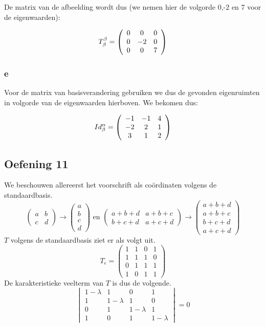 \documentclass[lineaire_algebra_oplossingen.tex]{subfiles}
\begin{document}
De matrix van de afbeelding wordt dus (we nemen hier de volgorde 0,-2 en 7 voor de eigenwaarden):

\[
T^\beta_\beta = \left(
\begin{array}{c c c}
0 & 0 & 0 \\
0 & -2 & 0 \\
0 & 0 & 7 \\
\end{array}
\right)
\]

\subsubsection*{e}

Voor de matrix van basisverandering gebruiken we dus de gevonden eigenruimten in volgorde van de eigenwaarden hierboven. We bekomen dus:

\[
Id^\alpha_\beta = \left(
\begin{array}{c c c}
-1 & -1 & 4 \\
-2 & 2 & 1 \\
3 & 1 & 2 \\
\end{array}
\right)
\]

\subsection{Oefening 11}
We beschouwen allereerst het voorschrift als co\"ordinaten volgens de standaardbasis.
\[
\begin{pmatrix}
a & b\\
c & d
\end{pmatrix}
\rightarrow
\begin{pmatrix}
a \\ b \\ c \\ d
\end{pmatrix}
\text{ en }
\begin{pmatrix}
a+b+d & a+b+c\\
b+c+d & a+c+d
\end{pmatrix}
\rightarrow
\begin{pmatrix}
a+b+d \\ a+b+c \\ b+c+d \\ a+c+d
\end{pmatrix}
\]
$T$ volgens de standaardbasis ziet er als volgt uit. 
\[
T_\epsilon =
\begin{pmatrix}
1 & 1 & 0 & 1\\
1 & 1 & 1 & 0\\
0 & 1 & 1 & 1\\
1 & 0 & 1 & 1
\end{pmatrix}
\]
De karakteristieke veelterm van $T$ is dus de volgende.
\[
\begin{vmatrix}
1-\lambda & 1 & 0 & 1\\
1 & 1-\lambda & 1 & 0\\
0 & 1 & 1-\lambda & 1\\
1 & 0 & 1 & 1-\lambda
\end{vmatrix}
= 0
\]
\end{document}
